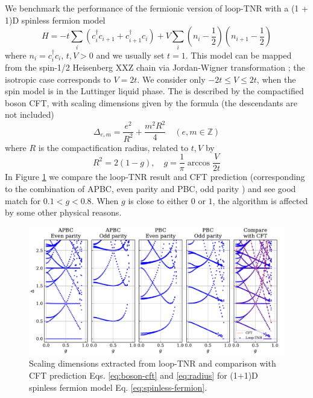 \documentclass[11pt]{article}
\begin{document}
We benchmark the performance of the fermionic version of loop-TNR with a (1 + 1)D spinless fermion model \cite{BaoThesis2019}
\begin{equation} \label{eq:spinless-fermion}
    H = -t \sum_i 
    (c_i^\dagger c_{i+1} + c_{i+1}^\dagger c_i) 
    + V \sum_i \left(n_i - \frac{1}{2}\right)\left(n_{i+1} - \frac{1}{2}\right)
\end{equation}
where $n_i = c_i^\dagger c_i$, $t,V > 0$ and we usually set $t = 1$. This model can be mapped from the spin-1/2 Heisenberg XXZ chain via Jordan-Wigner transformation \cite{Senechal2004}; the isotropic case corresponds to $V = 2t$. We consider only $-2t \le V \le 2t$, when the spin model is in the Luttinger liquid phase. The  is described by the compactified boson CFT, with scaling dimensions given by the formula \cite{FrancescoCFT} (the descendants are not included)
\begin{equation} \label{eq:boson-cft}
    \Delta_{e,m} = \frac{e^2}{R^2} + \frac{m^2 R^2}{4}
    \quad (e,m \in \mathbb{Z})
\end{equation}
where $R$ is the compactification radius, related to $t, V$ by
\begin{equation} \label{eq:radius}
    R^2 = 2(1 - g), \quad 
    g = \frac{1}{\pi} \arccos \frac{V}{2t}
\end{equation}
In Figure \ref{fig:spinless-fermion} we compare the loop-TNR result and CFT prediction (corresponding to the combination of APBC, even parity and PBC, odd parity \cite{Senechal2004}) and see good match for $0.1 < g < 0.8$. When $g$ is close to either $0$ or $1$, the algorithm is affected by {\color{red} some other physical reasons}.
\begin{figure}[ht]
    \centering
    \includegraphics[scale=0.65]{radius.pdf}
    \caption{
        Scaling dimensions extracted from loop-TNR and comparison with CFT prediction Eqs. \eqref{eq:boson-cft} and \eqref{eq:radius} for (1+1)D spinless fermion model Eq. \eqref{eq:spinless-fermion}.
    }
    \label{fig:spinless-fermion}
\end{figure}



\end{document}

